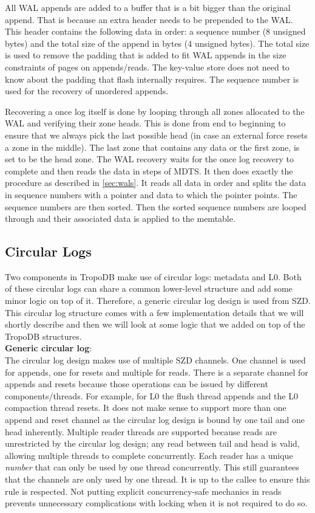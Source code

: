 All WAL appends are added to a buffer that is a bit bigger than the original append. That is because an extra header needs to be prepended to the WAL. This header contains the following data in order: a sequence number (8 unsigned bytes) and the total size of the append in bytes (4 unsigned bytes). The total size is used to remove the padding that is added to fit WAL appends in the size constraints of pages on appends/reads. The key-value store does not need to know about the padding that flash internally requires. The sequence number is used for the recovery of unordered appends.

Recovering a once log itself is done by looping through all zones allocated to the WAL and verifying their zone heads. This is done from end to beginning to ensure that we always pick the last possible head (in case an external force resets a zone in the middle). The last zone that contains any data or the first zone, is set to be the head zone. The WAL recovery waits for the once log recovery to complete and then reads the data in steps of MDTS. It then does exactly the procedure as described in \autoref{sec:wals}. It reads all data in order and splits the data in sequence numbers with a pointer and data to which the pointer points. The sequence numbers are then sorted. Then the sorted sequence numbers are looped through and their associated data is applied to the memtable.

\subsection{Circular Logs}
Two components in TropoDB make use of circular logs: metadata and L0. Both of these circular logs can share a common lower-level structure and add some minor logic on top of it. Therefore, a generic circular log design is used from SZD. This circular log structure comes with a few implementation details that we will shortly describe and then we will look at some logic that we added on top of the TropoDB structures. \\
\textbf{Generic circular log}:\\
The circular log design makes use of multiple SZD channels. One channel is used for appends, one for resets and multiple for reads. There is a separate channel for appends and resets because those operations can be issued by different components/threads. For example, for L0 the flush thread appends and the L0 compaction thread resets. It does not make sense to support more than one append and reset channel as the circular log design is bound by one tail and one head inherently. Multiple reader threads are supported because reads are unrestricted by the circular log design; any read between tail and head is valid, allowing multiple threads to complete concurrently. Each reader has a unique \textit{number} that can only be used by one thread concurrently. This still guarantees that the channels are only used by one thread. It is up to the callee to ensure this rule is respected. Not putting explicit concurrency-safe mechanics in reads prevents unnecessary complications with locking when it is not required to do so.

